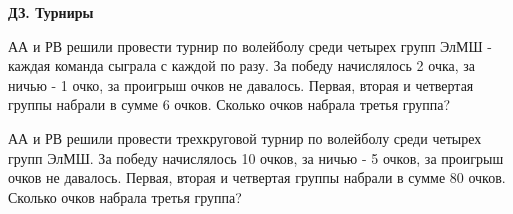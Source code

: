 \centerline{\bf \Huge ДЗ. Турниры}
\centerline{\bf \Huge }

 АА и РВ решили провести турнир по волейболу среди четырех групп ЭлМШ - каждая команда сыграла с каждой по разу. За победу начислялось 2 очка, за ничью - 1 очко, за проигрыш очков не давалось. Первая, вторая и четвертая группы набрали в сумме 6 очков. Сколько очков набрала третья группа?

 АА и РВ решили провести трехкруговой турнир по волейболу среди четырех групп ЭлМШ. За победу начислялось 10 очков, за ничью - 5 очков, за проигрыш очков не давалось. Первая, вторая и четвертая группы набрали в сумме 80 очков. Сколько очков набрала третья группа?

